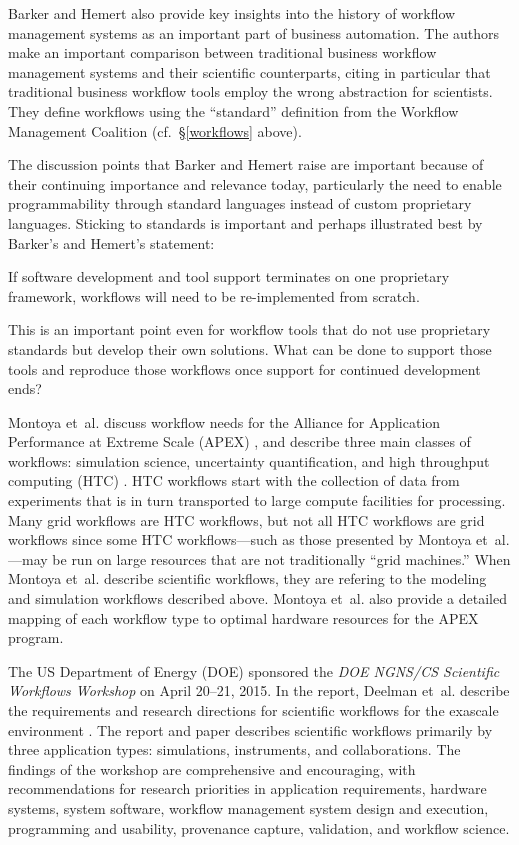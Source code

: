 Barker and Hemert also provide key insights into the history of workflow
management systems as an important part of business automation. The authors make
an important comparison between traditional business workflow management systems
and their scientific counterparts, citing in particular that traditional
business workflow tools employ the wrong abstraction for scientists. They define
workflows using the ``standard'' definition from the Workflow Management
Coalition (cf.~\S \ref{workflows} above).

The discussion points that Barker and Hemert raise are important because of
their continuing importance and relevance today, particularly the need to enable
programmability through standard languages instead of custom proprietary
languages. Sticking to standards is important and perhaps illustrated best
by Barker's and Hemert's statement:

\begin{displayquote} If software development and tool support terminates on one
proprietary framework, workflows will need to be re-implemented from scratch.
\end{displayquote}

This is an important point even for workflow tools that do not use proprietary
standards but develop their own solutions. What can be done to support those
tools and reproduce those workflows once support for continued development ends?

Montoya et~al. discuss workflow needs for the Alliance for Application
Performance at Extreme Scale (APEX) \cite{nersc_apex_2016}, and describe three
main classes of workflows: simulation science, uncertainty quantification,
and high throughput computing (HTC) \cite{montoya_apex_2016}.  HTC workflows
start with the collection of data from experiments that is in turn transported
to large compute facilities for processing. Many grid workflows are HTC
workflows, but not all HTC workflows are grid workflows since some HTC workflows---such as those presented by Montoya et~al.---may be run on large
resources that are not traditionally ``grid machines.'' When Montoya et~al.
describe scientific workflows, they are refering to the modeling and simulation
workflows described above. Montoya et~al. also provide a detailed mapping of
each workflow type to optimal hardware resources for the APEX program.

The US Department of Energy (DOE) sponsored the \emph{DOE NGNS/CS Scientific
Workflows Workshop} on April 20--21, 2015. In the report, Deelman et~al.
describe the requirements and research directions for scientific workflows for
the exascale environment \cite{deelman_future_2015}\cite{deelman_future_2017}.
The report and paper describes scientific workflows primarily by three
application types: simulations, instruments, and collaborations. The findings of
the workshop are comprehensive and encouraging, with recommendations for
research priorities in application requirements, hardware systems, system
software, workflow management system design and execution, programming and
usability, provenance capture, validation, and workflow science.

